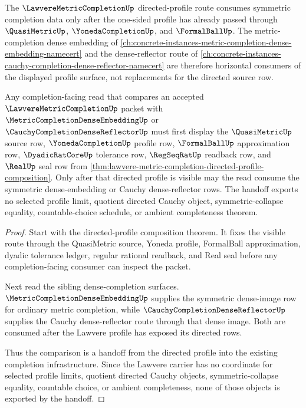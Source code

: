 The $\LawvereMetricCompletionUp$ directed-profile route consumes symmetric completion data only after the one-sided profile has already passed through $\QuasiMetricUp$, $\YonedaCompletionUp$, and $\FormalBallUp$. The metric-completion dense embedding of \autoref{ch:concrete-instances-metric-completion-dense-embedding-namecert} and the dense-reflector route of \autoref{ch:concrete-instances-cauchy-completion-dense-reflector-namecert} are therefore horizontal consumers of the displayed profile surface, not replacements for the directed source row.

\begin{proposition}
\label{prop:lawvere-metric-completion-dense-reflector-handoff}
Any completion-facing read that compares an accepted $\LawvereMetricCompletionUp$ packet with $\MetricCompletionDenseEmbeddingUp$ or $\CauchyCompletionDenseReflectorUp$ must first display the $\QuasiMetricUp$ source row, $\YonedaCompletionUp$ profile row, $\FormalBallUp$ approximation row, $\DyadicRatCoreUp$ tolerance row, $\RegSeqRatUp$ readback row, and $\RealUp$ seal row from \autoref{thm:lawvere-metric-completion-directed-profile-composition}. Only after that directed profile is visible may the read consume the symmetric dense-embedding or Cauchy dense-reflector rows. The handoff exports no selected profile limit, quotient directed Cauchy object, symmetric-collapse equality, countable-choice schedule, or ambient completeness theorem.
\end{proposition}
\begin{proof}
Start with the directed-profile composition theorem. It fixes the visible route through the QuasiMetric source, Yoneda profile, FormalBall approximation, dyadic tolerance ledger, regular rational readback, and Real seal before any completion-facing consumer can inspect the packet.

Next read the sibling dense-completion surfaces. $\MetricCompletionDenseEmbeddingUp$ supplies the symmetric dense-image row for ordinary metric completion, while $\CauchyCompletionDenseReflectorUp$ supplies the Cauchy dense-reflector route through that dense image. Both are consumed after the Lawvere profile has exposed its directed rows.

Thus the comparison is a handoff from the directed profile into the existing completion infrastructure. Since the Lawvere carrier has no coordinate for selected profile limits, quotient directed Cauchy objects, symmetric-collapse equality, countable choice, or ambient completeness, none of those objects is exported by the handoff.
\end{proof}

